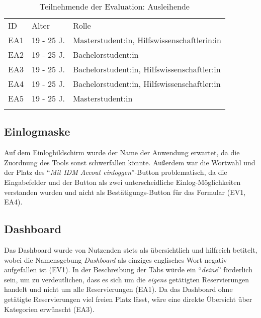 \begin{table}[h]
  \centering
  \caption{Teilnehmende der Evaluation: Ausleihende}
  \begin{tabular}{lll}
    \arrayrulecolor{maincolor}\hline
    \sffamily\color{maincolor}ID & \sffamily\color{maincolor}Alter &
    \sffamily\color{maincolor}Rolle                                  \\
    \arrayrulecolor{maincolor}\hline
    EA1                         & 19 - 25 J.                      &
    Masterstudent:in, Hilfswissenschaftlerin:in                      \\
    EA2                         & 19 - 25 J.                      &
    Bachelorstudent:in                                               \\
    EA3                         & 19 - 25 J.                      &
    Bachelorstudent:in, Hilfswissenschaftler:in                      \\
    EA4                         & 19 - 25 J.                      &
    Bachelorstudent:in, Hilfswissenschaftler:in                      \\
    EA5                         & 19 - 25 J.                      &
    Masterstudent:in                                                 \\
    \arrayrulecolor{maincolor}\hline
  \end{tabular}
  \label{table:azwei}
\end{table}

\subsection{Einlogmaske}
Auf dem Einlogbildschirm wurde der Name der Anwendung erwartet, da die
Zuordnung des Tools sonst schwerfallen könnte. Außerdem war die Wortwahl und der
Platz des \enquote{\textit{Mit IDM Accout einloggen}}-Button problematisch, da die
Eingabefelder und der Button als zwei unterscheidliche Einlog-Möglichkeiten verstanden
wurden und nicht als Bestätigungs-Button für das Formular (EV1, EA4).

\subsection{Dashboard}
Das Dashboard wurde von Nutzenden stets als übersichtlich und hilfreich
betitelt, wobei die Namensgebung \textit{Dashboard} als einziges englisches
Wort negativ aufgefallen ist (EV1). In der Beschreibung der Tabs würde ein
\enquote{\textit{deine}} förderlich sein, um zu verdeutlichen, dass es sich um die \textit{eigens}
getätigten Reservierungen handelt und nicht um alle Reservierungen (EA1). Da
das Dashboard ohne getätigte Reservierungen viel freien Platz lässt, wäre eine
direkte Übersicht über Kategorien erwünscht (EA3). 

